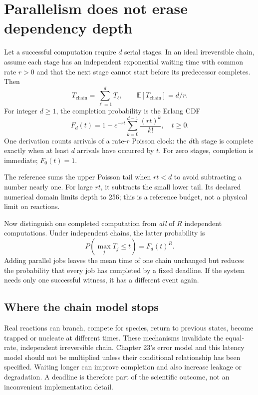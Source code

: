 \section{Parallelism does not erase dependency depth}
Let a successful computation require $d$ serial stages. In an ideal irreversible
chain, assume each stage has an independent exponential waiting time with common
rate $r>0$ and that the next stage cannot start before its predecessor completes.
Then
\[
T_{\mathrm{chain}}=\sum_{\ell=1}^{d}T_\ell,\qquad
\mathbb E[T_{\mathrm{chain}}]=d/r.
\]
For integer $d\ge1$, the completion probability is the Erlang CDF
\begin{equation}
F_d(t)=1-e^{-rt}\sum_{k=0}^{d-1}\frac{(rt)^k}{k!},
\quad t\ge0.
\label{dnad24:erlang}
\end{equation}
One derivation counts arrivals of a rate-$r$ Poisson clock: the $d$th stage is
complete exactly when at least $d$ arrivals have occurred by $t$.
For zero stages, completion is immediate; $F_0(t)=1$.

The reference sums the upper Poisson tail when $rt<d$ to avoid subtracting a
number nearly one. For large $rt$, it subtracts the small lower tail.
Its declared numerical domain limits depth to 256; this is a reference budget,
not a physical limit on reactions.

Now distinguish one completed computation from \emph{all} of $R$ independent
computations. Under independent chains, the latter probability is
\[
P(\max_jT_j\le t)=F_d(t)^R.
\]
Adding parallel jobs leaves the mean time of one chain unchanged but reduces the
probability that every job has completed by a fixed deadline.
If the system needs only one successful witness, it has a different event again.


\subsection{Where the chain model stops}
Real reactions can branch, compete for species, return to previous states, become
trapped or nucleate at different times. These mechanisms invalidate the equal-rate,
independent irreversible chain. Chapter 23's error model and this latency model
should not be multiplied unless their conditional relationship has been specified.
Waiting longer can improve completion and also increase leakage or degradation.
A deadline is therefore part of the scientific outcome, not an inconvenient
implementation detail.

